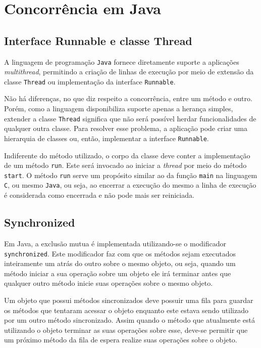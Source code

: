 \chapter{Concorrência em Java}
\label{cha:concjava}

\section{Interface Runnable e classe Thread}

A linguagem de programação \texttt{Java} fornece diretamente suporte a
aplicações \textit{multithread}, permitindo a criação de linhas de
execução por meio de extensão da classe \verb!Thread! ou implementação
da interface \verb!Runnable!.

Não há diferenças, no que diz respeito a concorrência, entre um método
e outro. Porém, como a linguagem disponibiliza suporte apenas a
herança simples, extender a classe \verb!Thread! significa que não
será possível herdar funcionalidades de qualquer outra classe. Para
resolver esse problema, a aplicação pode criar uma hierarquia de
classes ou, então, implementar a interface \verb!Runnable!.

Indiferente do método utilizado, o corpo da classe deve conter a
implementação de um método \verb!run!. Este será invocado ao iniciar a
\textit{thread} por meio do método \verb!start!. O método \verb!run!
serve um propósito similar ao da função \verb!main! na linguagem
\texttt{C}, ou mesmo \texttt{Java}, ou seja, ao encerrar a execução do
mesmo a linha de execução é considerada como encerrada e não pode mais
ser reiniciada.

\section{Synchronized}

Em Java, a exclusão mutua é implementada utilizando-se o modificador
\texttt{synchronized}. Este modificador faz com que os métodos sejam
executados inteiramente um atrás do outro sobre o mesmo objeto, ou seja,
quando um método iniciar a sua operação sobre um objeto ele irá terminar
antes que qualquer outro método inicie suas operações sobre o mesmo objeto.

Um objeto que possui métodos sincronizados deve possuir uma fila para
guardar os métodos que tentaram acessar o objeto enquanto este estava sendo
utilizado por um outro método sincronizado. Assim quando o método que
atualmente está utilizando o objeto terminar as suas operações sobre esse,
deve-se permitir que um próximo método da fila de espera realize suas
operações sobre o objeto.

